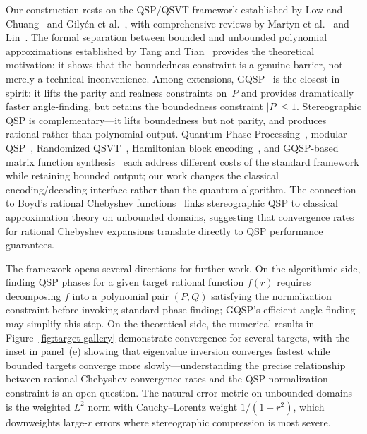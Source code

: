 Our construction rests on the QSP/QSVT framework established
by Low and Chuang~\cite{LowChuang2017,LowChuang2019} and
Gily\'en et al.~\cite{GSLW2019}, with comprehensive reviews by
Martyn et al.~\cite{MartynRossiTanChuang2021} and
Lin~\cite{Lin2022}.  The formal separation between bounded and
unbounded polynomial approximations established by Tang and
Tian~\cite{TangTian2024} provides the theoretical motivation:
it shows that the boundedness constraint is a genuine barrier,
not merely a technical inconvenience.  Among extensions,
GQSP~\cite{MotlaghWiebe2023} is the closest in spirit: it
lifts the parity and realness constraints on~$P$ and provides
dramatically faster angle-finding, but retains the boundedness
constraint $|P| \leq 1$.  Stereographic QSP is
complementary---it lifts boundedness but not parity, and
produces rational rather than polynomial output.  Quantum Phase
Processing~\cite{WangZhangYuWang2023}, modular
QSP~\cite{RossiCeroniChuang2025}, Randomized
QSVT~\cite{WangZhangHazraEtAl2025}, Hamiltonian block
encoding~\cite{KangSu2025}, and GQSP-based matrix function
synthesis~\cite{MahasingheEtAl2025} each address different
costs of the standard framework while retaining bounded output;
our work changes the classical encoding/decoding interface
rather than the quantum algorithm.  The connection to Boyd's
rational Chebyshev
functions~\cite{Boyd1990,Boyd1987} links stereographic QSP to
classical approximation theory on unbounded domains, suggesting
that convergence rates for rational Chebyshev expansions
translate directly to QSP performance guarantees.

The framework opens several directions for further work.  On
the algorithmic side, finding QSP phases for a given target
rational function $f(r)$ requires decomposing $f$ into a
polynomial pair $(P, Q)$ satisfying the normalization
constraint before invoking standard phase-finding; GQSP's
efficient angle-finding~\cite{MotlaghWiebe2023} may simplify
this step.  On the theoretical side, the numerical results in
Figure~\ref{fig:target-gallery} demonstrate convergence for
several targets, with the inset in panel~(e) showing that
eigenvalue inversion converges fastest while bounded targets
converge more slowly---understanding the precise relationship
between rational Chebyshev convergence rates and the QSP
normalization constraint is an open question.  The natural
error metric on unbounded domains is the weighted $L^2$ norm
with Cauchy--Lorentz weight $1/(1+r^2)$, which downweights
large-$r$ errors where stereographic compression is most
severe.

